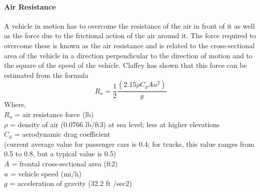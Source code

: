 \paragraph{Air Resistance}
A vehicle in motion has to overcome the resistance of the air in front of it as well as the force due to the frictional action of the air around it. The force required to overcome these is known as the air resistance and is related to the cross-sectional area of the vehicle in a direction perpendicular to the direction of motion and to the square of the speed of the vehicle. Claffey has shown that this force can be estimated from the formula
\begin{equation}
	R_a = \frac{1}{2}\frac{(2.15\rho C_d A u^2)}{g}
\end{equation}
Where,\\
\hspace*{10mm}$R_a$ = air resistance force (lb)\\
\hspace*{10mm}$\rho$ = density of air (0.0766 lb/ft3) at sea level; less at higher elevations\\
\hspace*{10mm}$C_d$ = aerodynamic drag coefficient\\
\hspace*{10mm}(current average value for passenger cars is 0.4; for trucks, this value ranges from 0.5 to 0.8, but a typical value is 0.5)\\
\hspace*{10mm}$A$ = frontal cross-sectional area (ft2)\\
\hspace*{10mm}$u$ = vehicle speed (mi/h)\\
\hspace*{10mm}$g$ = acceleration of gravity (32.2 ft /sec2)

